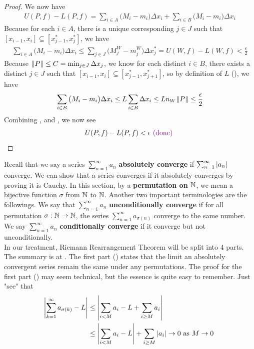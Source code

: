 \documentclass{report}
\begin{document}
\begin{proof}
We now have 
\begin{align}
\label{e2}
U(P,f)-L(P,f)= \sum_{i \in A} \big(M_i-m_i \big) \Delta x_i +\sum_{i \in B} \big(M_i-m_i \big)\Delta x_i
\end{align}
Because for each $i\in A$, there is a unique corresponding $j \in J$ such that $[x_{i-1},x_i] \subseteq [x_{j-1}^*,x_j^*]$, we have 
\begin{align}
  \label{e3}
\sum_{i \in A} \big( M_i-m_i\big) \Delta x_i \leq \sum_{j \in J} \big(M_j^W-m_j^W \big) \Delta x_j^* = U(W,f)-L(W,f)< \frac{\epsilon}{2}
\end{align}
Because $\| P \|\leq C=\min_{j \in J} \Delta x_j$, we know for each distinct $i \in B$, there exists a distinct $ j \in J$ such that $[x_{i-1},x_i]\subseteq [x_{j-1}^*, x_{j+1}^*]$, so by definition of $L$  (), we have 
\begin{align}
\label{e4}
\sum_{i \in B} \big(M_i-m_i \big) \Delta x_i \leq L\sum_{i \in B} \Delta x_i \leq L n_W \| P \| \leq \frac{\epsilon }{2} 
\end{align}
Combining  ,  and , we now see 
\begin{align*}
U(P,f)-L(P,f) <\epsilon \textcolor{violet}{\text{ (done) }}
\end{align*}
\end{proof}
\begin{mdframed}
Recall that we say a series $\sum_{n=1}^\infty a_n$ \textbf{absolutely converge} if $\sum_{n=1}^\infty \left|a_n\right| $ converge. We can show that a series converges if it absolutely converges by proving it is Cauchy. In this section, by a \textbf{permutation on $\mathbb{N}$}, we mean a bijective function $\sigma$ from $\mathbb{N}$ to $\mathbb{N}$. Another two important terminologies are the followings. We say that $\sum_{n=1}^\infty a_n$ \textbf{unconditionally converge} if for all permutation $\sigma:\mathbb{N}\rightarrow \mathbb{N}$, the series $\sum_{n=1}^\infty a_{\sigma(n)}$ converge to the same number. We say $\sum_{n=1}^\infty a_n$ \textbf{conditionally converge} if it converge but not unconditionally.\\

In our treatment, Riemann Rearrangement Theorem will be split into 4 parts. The summary is at . The first part () states that the limit an absolutely convergent series remain the same under any permutations. The proof for the first part () may seem technical, but the essence is quite easy to remember. Just "see" that 
\begin{align*}
  \left|\sum_{k=1}^\infty a_{\sigma (k)}-L\right|&\leq \left|\sum_{i<M}a_i -L + \sum_{i\geq M}a_i\right|\\
&\leq \left|\sum_{i<M}a_i-L \right|+\sum_{i\geq M} \left|a_i\right| \to 0 \text{ as $M\to 0$ }
\end{align*}
\end{mdframed}
\end{document}
